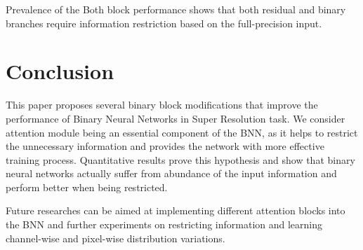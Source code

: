 \documentclass{article}
\begin{document}
Prevalence of the Both block performance shows that both residual and binary branches require information restriction based on the full-precision input.

\clearpage
\section{Conclusion}
This paper proposes several binary block modifications that improve the performance of Binary Neural Networks in Super Resolution task. We consider attention module being an essential component of the BNN, as it helps to restrict the unnecessary information and provides the network with more effective training process. Quantitative results prove this hypothesis and show that binary neural networks actually suffer from abundance of the input information and perform better when being restricted. 

Future researches can be aimed at implementing different attention blocks into the BNN and further experiments on restricting information and learning channel-wise and pixel-wise distribution variations.


\end{document}
